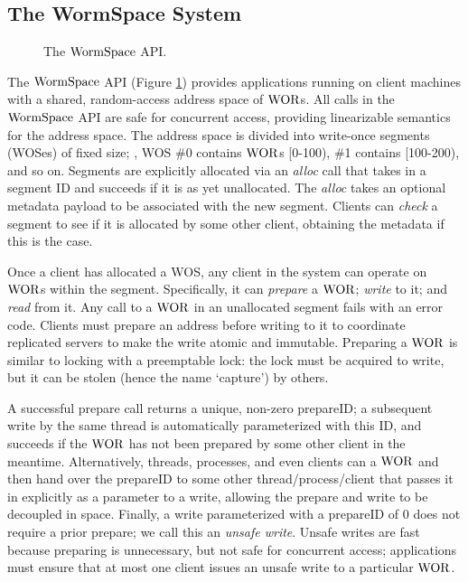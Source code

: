 \subsection{The WormSpace System}
\label{chapter:wormspace:subsec:wormspace-system}

\begin{figure}

\caption{The $\mathrm{WormSpace}$ API.}
\label{fig:chapter:multipaxos:api}
\end{figure}

The $\mathrm{WormSpace}$ API (Figure \ref{fig:chapter:multipaxos:api}) provides applications running on client machines with a shared, 
random-access address space of $\mathrm{WOR}$s. 
All calls in the $\mathrm{WormSpace}$ API are safe for concurrent access, providing linearizable semantics for the address space. 
The address space is divided into write-once segments (WOSes) of fixed size; 
\ie, WOS \#0 contains $\mathrm{WOR}$s [0-100), \#1 contains [100-200), and so on. 
Segments are explicitly allocated via an \textit{alloc} call that takes in a segment ID and succeeds if it is as yet unallocated. 
The \textit{alloc} takes an optional metadata payload to be associated with the new segment.
 Clients can \textit{check} a segment to see if it is allocated by some other client, obtaining the metadata if this is the case. 

Once a client has allocated a WOS, any client in the system can operate on $\mathrm{WOR}$s within the segment. 
Specifically, it can \textit{prepare} a $\mathrm{WOR}$; \textit{write} to it; and \textit{read} from it.
Any call to a $\mathrm{WOR}$ in an unallocated segment fails with an error code. 
Clients must prepare an address before writing to it to coordinate replicated servers to make the write atomic and immutable.
Preparing a $\mathrm{WOR}$ is similar to locking with a preemptable lock: the lock must be acquired to write, but it can be stolen (hence the name `capture') by others.

A successful prepare call returns a unique, non-zero prepareID; a subsequent write by the same thread is automatically parameterized with this ID, and succeeds if the $\mathrm{WOR}$ has not been prepared by some other client in the meantime. Alternatively, threads, processes, and even clients can  a $\mathrm{WOR}$ and then hand over the prepareID to some other thread/process/client that passes it in explicitly as a parameter to a write, allowing the prepare and write to be decoupled in space. Finally, a write parameterized with a prepareID of 0 does not require a prior prepare; we call this an \textit{unsafe write}. 
Unsafe writes are fast because preparing is unnecessary, but not safe for concurrent access; applications must ensure that at most one client issues an unsafe write to a particular $\mathrm{WOR}$.

